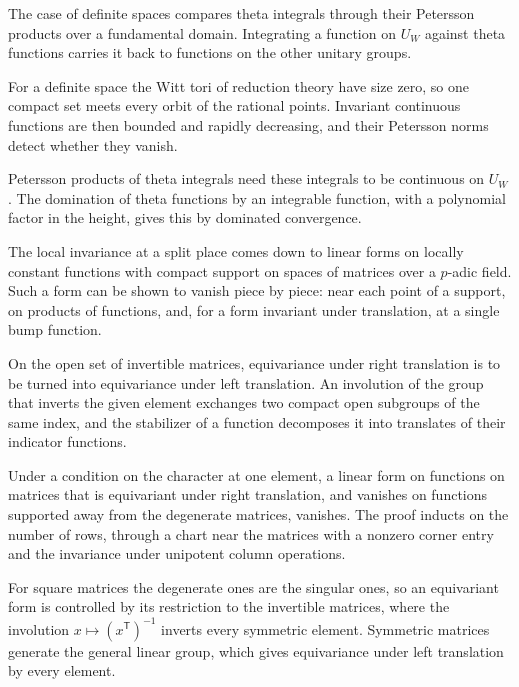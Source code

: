 The case of definite spaces compares theta integrals through their Petersson
products over a fundamental domain. Integrating a function on $U_W$ against
theta functions carries it back to functions on the other unitary groups.

For a definite space the Witt tori of reduction theory have size zero, so one
compact set meets every orbit of the rational points. Invariant continuous
functions are then bounded and rapidly decreasing, and their Petersson norms
detect whether they vanish.

Petersson products of theta integrals need these integrals to be continuous on
$U_W$. The domination of theta functions by an integrable function, with a
polynomial factor in the height, gives this by dominated convergence.

The local invariance at a split place comes down to linear forms on locally
constant functions with compact support on spaces of matrices over a $p$-adic
field. Such a form can be shown to vanish piece by piece: near each point of a
support, on products of functions, and, for a form invariant under translation,
at a single bump function.

On the open set of invertible matrices, equivariance under right translation is
to be turned into equivariance under left translation. An involution of the
group that inverts the given element exchanges two compact open subgroups of
the same index, and the stabilizer of a function decomposes it into translates
of their indicator functions.

Under a condition on the character at one element, a linear form on functions
on matrices that is equivariant under right translation, and vanishes on
functions supported away from the degenerate matrices, vanishes. The proof
inducts on the number of rows, through a chart near the matrices with a nonzero
corner entry and the invariance under unipotent column operations.

For square matrices the degenerate ones are the singular ones, so an
equivariant form is controlled by its restriction to the invertible matrices,
where the involution $x\mapsto(x^{\mathsf T})^{-1}$ inverts every symmetric
element. Symmetric matrices generate the general linear group, which gives
equivariance under left translation by every element.

